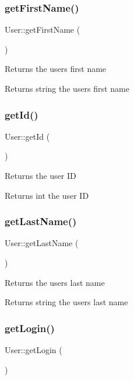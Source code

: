 \subsubsection{\texorpdfstring{get\+First\+Name()}{getFirstName()}}
{\footnotesize\ttfamily User\+::get\+First\+Name (\begin{DoxyParamCaption}{ }\end{DoxyParamCaption})}

Returns the user\textquotesingle{}s first name \begin{DoxyReturn}{Returns}
string the user\textquotesingle{}s first name 
\end{DoxyReturn}
\mbox{\label{classUser_a39ad6e655fcc40623b9af2203cd7afa5}} 
\subsubsection{\texorpdfstring{get\+Id()}{getId()}}
{\footnotesize\ttfamily User\+::get\+Id (\begin{DoxyParamCaption}{ }\end{DoxyParamCaption})}

Returns the user ID \begin{DoxyReturn}{Returns}
int the user ID 
\end{DoxyReturn}
\mbox{\label{classUser_af0efc9a6afcaf0774ef627dbc4dbe43e}} 
\subsubsection{\texorpdfstring{get\+Last\+Name()}{getLastName()}}
{\footnotesize\ttfamily User\+::get\+Last\+Name (\begin{DoxyParamCaption}{ }\end{DoxyParamCaption})}

Returns the user\textquotesingle{}s last name \begin{DoxyReturn}{Returns}
string the user\textquotesingle{}s last name 
\end{DoxyReturn}
\mbox{\label{classUser_abb7fb2783594f43943adcaa292f060e4}} 
\subsubsection{\texorpdfstring{get\+Login()}{getLogin()}}
{\footnotesize\ttfamily User\+::get\+Login (\begin{DoxyParamCaption}{ }\end{DoxyParamCaption})}

